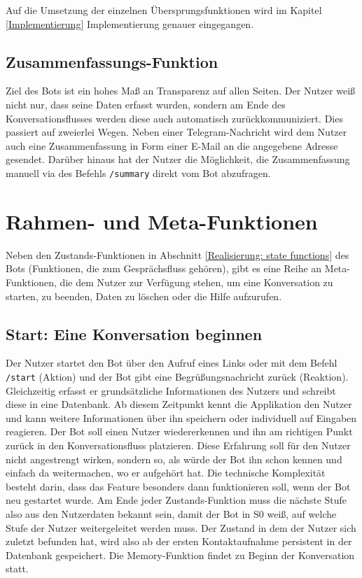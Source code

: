             Auf die Umsetzung der einzelnen Übersprungsfunktionen wird im Kapitel \ref{Implementierung} Implementierung genauer eingegangen.
    
        \subsection{Zusammenfassungs-Funktion}
            Ziel des Bots ist ein hohes Maß an Transparenz auf allen Seiten. Der Nutzer weiß nicht nur, dass seine Daten erfasst wurden, sondern am Ende des Konversationsflusses werden diese auch automatisch zurückkommuniziert. Dies passiert auf zweierlei Wegen. Neben einer Telegram-Nachricht wird dem Nutzer auch eine Zusammenfassung in Form einer E-Mail an die angegebene Adresse gesendet. Darüber hinaus hat der Nutzer die Möglichkeit, die Zusammenfassung manuell via des Befehls \verb|/summary| direkt vom Bot abzufragen. 


    \section{Rahmen- und Meta-Funktionen} \label{Realisierung: meta functions}
            Neben den Zustands-Funktionen in Abschnitt \ref*{Realisierung: state functions} des Bots (Funktionen, die zum Gesprächsfluss gehören), gibt es eine Reihe an Meta-Funktionen, die dem Nutzer zur Verfügung stehen, um eine Konversation zu starten, zu beenden, Daten zu löschen oder die Hilfe aufzurufen.
            
            \subsection{Start: Eine Konversation beginnen}
            Der Nutzer startet den Bot über den Aufruf eines Links oder mit dem Befehl \verb|/start| (Aktion) und der Bot gibt eine Begrüßungsnachricht zurück (Reaktion). Gleichzeitig erfasst er grundsätzliche Informationen des Nutzers und schreibt diese in eine Datenbank. Ab diesem Zeitpunkt kennt die Applikation den Nutzer und kann weitere Informationen über ihn speichern oder individuell auf Eingaben reagieren. Der Bot soll einen Nutzer wiedererkennen und ihn am richtigen Punkt zurück in den Konversationsfluss platzieren. Diese Erfahrung soll für den Nutzer nicht angestrengt wirken, sondern so, als würde der Bot ihn schon kennen und einfach da weitermachen, wo er aufgehört hat. Die technische Komplexität besteht darin, dass das Feature besonders dann funktionieren soll, wenn der Bot neu gestartet wurde. Am Ende jeder Zustands-Funktion muss die nächste Stufe also aus den Nutzerdaten bekannt sein, damit der Bot in S0 weiß, auf welche Stufe der Nutzer weitergeleitet werden muss. Der Zustand in dem der Nutzer sich zuletzt befunden hat, wird also ab der ersten Kontaktaufnahme persistent in der Datenbank gespeichert. Die Memory-Funktion findet zu Beginn der Konversation statt. 
            
